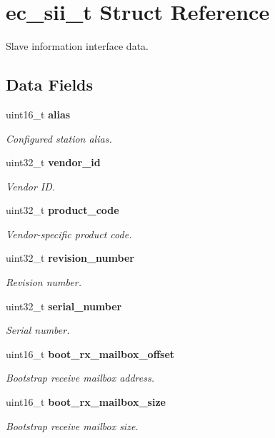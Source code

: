 \section{ec\-\_\-sii\-\_\-t Struct Reference}
\label{structec__sii__t}


Slave information interface data.  


\subsection*{Data Fields}
\begin{DoxyCompactItemize}
\item 
uint16\-\_\-t {\bf alias}
\begin{DoxyCompactList}\small\item\em Configured station alias. \end{DoxyCompactList}\item 
uint32\-\_\-t {\bf vendor\-\_\-id}
\begin{DoxyCompactList}\small\item\em Vendor I\-D. \end{DoxyCompactList}\item 
uint32\-\_\-t {\bf product\-\_\-code}
\begin{DoxyCompactList}\small\item\em Vendor-\/specific product code. \end{DoxyCompactList}\item 
uint32\-\_\-t {\bf revision\-\_\-number}
\begin{DoxyCompactList}\small\item\em Revision number. \end{DoxyCompactList}\item 
uint32\-\_\-t {\bf serial\-\_\-number}
\begin{DoxyCompactList}\small\item\em Serial number. \end{DoxyCompactList}\item 
uint16\-\_\-t {\bf boot\-\_\-rx\-\_\-mailbox\-\_\-offset}
\begin{DoxyCompactList}\small\item\em Bootstrap receive mailbox address. \end{DoxyCompactList}\item 
uint16\-\_\-t {\bf boot\-\_\-rx\-\_\-mailbox\-\_\-size}
\begin{DoxyCompactList}\small\item\em Bootstrap receive mailbox size. \end{DoxyCompactList}\item 

\end{DoxyCompactItemize}
